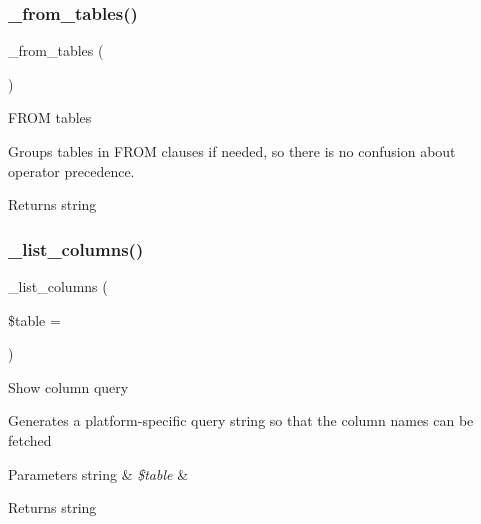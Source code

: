 \subsubsection{\texorpdfstring{\+\_\+from\+\_\+tables()}{\_from\_tables()}}
{\footnotesize\ttfamily \+\_\+from\+\_\+tables (\begin{DoxyParamCaption}{ }\end{DoxyParamCaption})\hspace{0.3cm}{\ttfamily [protected]}}

F\+R\+OM tables

Groups tables in F\+R\+OM clauses if needed, so there is no confusion about operator precedence.

\begin{DoxyReturn}{Returns}
string 
\end{DoxyReturn}
\mbox{\label{class_c_i___d_b__mysql__driver_a7ccb7f9c301fe7f0a9db701254142b63}} 
\subsubsection{\texorpdfstring{\+\_\+list\+\_\+columns()}{\_list\_columns()}}
{\footnotesize\ttfamily \+\_\+list\+\_\+columns (\begin{DoxyParamCaption}\item[{}]{\$table = {\ttfamily \textquotesingle{}\textquotesingle{}} }\end{DoxyParamCaption})\hspace{0.3cm}{\ttfamily [protected]}}

Show column query

Generates a platform-\/specific query string so that the column names can be fetched


\begin{DoxyParams}[1]{Parameters}
string & {\em \$table} & \\
\hline
\end{DoxyParams}
\begin{DoxyReturn}{Returns}
string 
\end{DoxyReturn}
\mbox{\label{class_c_i___d_b__mysql__driver_a435c0f3ce54fe7daa178baa8532ebd54}} 
